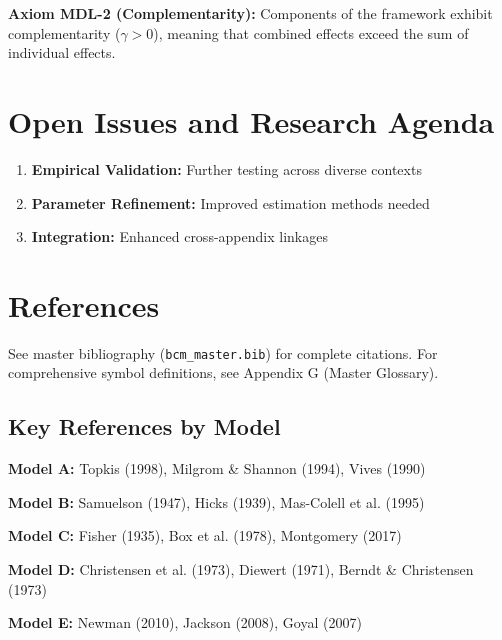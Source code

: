\begin{tcolorbox}[colback=yellow!5!white,colframe=yellow!75!black,title=Axiom MDL-2: Complementarity]
\textbf{Axiom MDL-2 (Complementarity):}
Components of the framework exhibit complementarity ($\gamma > 0$), meaning
that combined effects exceed the sum of individual effects.
\end{tcolorbox}



\section{Open Issues and Research Agenda}
\label{sec:mdl-open}

\begin{enumerate}
    \item \textbf{Empirical Validation:} Further testing across diverse contexts
    \item \textbf{Parameter Refinement:} Improved estimation methods needed
    \item \textbf{Integration:} Enhanced cross-appendix linkages
\end{enumerate}

\section{References}
\label{sec:mdl-references}

\nocite{bcm_master}

See master bibliography (\texttt{bcm\_master.bib}) for complete citations.
For comprehensive symbol definitions, see Appendix G (Master Glossary).

\subsection{Key References by Model}

\textbf{Model A:} Topkis (1998), Milgrom \& Shannon (1994), Vives (1990)

\textbf{Model B:} Samuelson (1947), Hicks (1939), Mas-Colell et al. (1995)

\textbf{Model C:} Fisher (1935), Box et al. (1978), Montgomery (2017)

\textbf{Model D:} Christensen et al. (1973), Diewert (1971), Berndt \& Christensen (1973)

\textbf{Model E:} Newman (2010), Jackson (2008), Goyal (2007)

